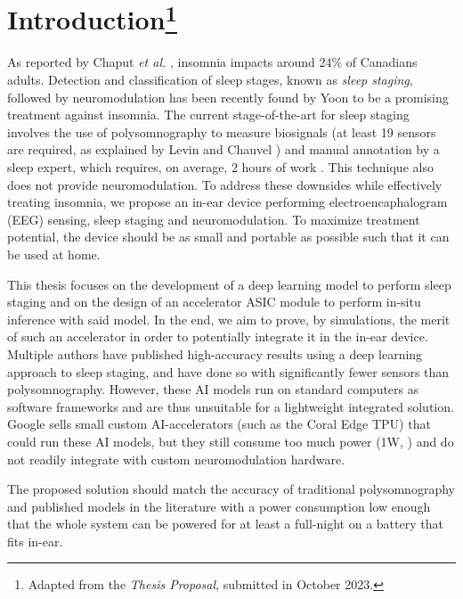 \documentclass[12pt, hidelinks]{article}
\begin{document}
    \section[Introduction]{Introduction\footnote{Adapted from the \textit{Thesis Proposal}, submitted in October 2023.}}
    As reported by Chaput \textit{et al.} \cite{insomnia_prevalence}, insomnia impacts around 24\% of Canadians adults. Detection and classification of sleep stages, known as \textit{sleep staging}, followed by neuromodulation has been recently found by Yoon
    \cite{yoon2021neuromodulation} to be a promising treatment against insomnia. The current stage-of-the-art for sleep staging involves the use of polysomnography to measure biosignals (at least 19 sensors are required, as explained by Levin and Chauvel \cite{RUNDO2019381})
    and manual annotation by a sleep expert, which requires, on average, 2 hours of work \cite{phan2022automatic}. This technique also does not provide neuromodulation. To address these downsides while effectively treating insomnia, we propose an in-ear device performing
    electroencaphalogram (EEG) sensing, sleep staging and neuromodulation. To maximize treatment potential, the device should be as small and portable as possible such that it can be used at home.

    This thesis focuses on the development of a deep learning model to perform sleep staging and on the design of an accelerator ASIC module to perform in-situ inference with said model. In the end, we aim to prove, by simulations, the merit of such an accelerator in order to
    potentially integrate it in the in-ear device. Multiple authors \cite{dutt2023sleepxai, fu2021deep, eldele2021attention} have published high-accuracy results using a deep learning approach to sleep staging, and have done so with significantly fewer sensors than polysomnography.
    However, these AI models run on standard computers as software frameworks and are thus unsuitable for a lightweight integrated solution. Google sells small custom AI-accelerators (such as the Coral Edge TPU) that could run these AI models, but they still consume too much
    power (1W, \cite{coral_datasheet}) and do not readily integrate with custom neuromodulation hardware.

    The proposed solution should match the accuracy of traditional polysomnography and published models in the literature with a power consumption low enough that the whole system can be powered for at least a full-night on a battery that fits in-ear.
\end{document}
